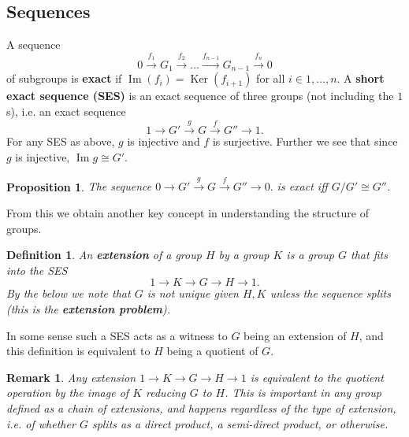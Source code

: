 \documentclass{report}
\DeclareMathOperator{\im}{Im}
\DeclareMathOperator{\ker}{Ker}
\newtheorem{proposition}{Proposition}
\newtheorem{defi}{Definition}
\newtheorem{rmk}{Remark}
\begin{document}
\begin{singlespace}
\begin{enumerate}
 \section{Sequences}
  A sequence
  \[
    0\xrightarrow{f_1}G_1 \xrightarrow{f_2}\ldots\xrightarrow{f_{n-1}} G_{n-1}\xrightarrow{f_{n}} 0
  \]
  of subgroups is \textbf{exact} if $\im(f_i)=\ker(f_{i+1})$ for all $i\in 1,\ldots, n$. A \textbf{short exact sequence (SES)} is an exact sequence of three groups (not including the $1$s), i.e. an exact sequence
  \[
    1\to G'\xrightarrow{g}G\xrightarrow{f} G''\to 1.
  \]
  For any SES as above, $g$ is injective and $f$ is surjective. Further we see that since $g$ is injective, $\im g\cong G'$.
  \begin{proposition}
    The sequence
    $
      0\to G'\xrightarrow{g}G\xrightarrow{f} G''\to 0.
    $
    is exact iff $G/G'\cong G''$.
  \end{proposition}
  From this we obtain another key concept in understanding the structure of groups.
  \begin{defi}
    An \textbf{extension} of a group $H$ by a group $K$ is a group $G$ that fits into the SES
    \[
      1\to K\to G\to H\to 1.
    \]
    By the below we note that $G$ is not unique given $H,K$ unless the sequence splits (this is the \textbf{extension problem}).
  \end{defi}
  In some sense such a SES acts as a witness to $G$ being an extension of $H$, and this definition is equivalent to $H$ being a quotient of $G$.
  \begin{rmk}
    Any extension $1\to K\to G\to H\to 1$ is equivalent to the quotient operation by the image of $K$ reducing $G$ to $H$. This is important in any group defined as a chain of extensions, and happens \textit{regardless} of the type of extension, i.e. of whether $G$ splits as a direct product, a semi-direct product, or otherwise.
  \end{rmk}
  

\end{enumerate}
\end{singlespace}
\end{document}
